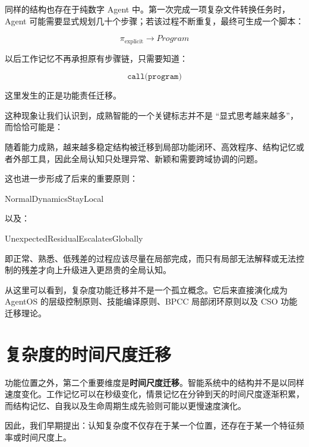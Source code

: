 同样的结构也存在于纯数字 Agent 中。第一次完成一项复杂文件转换任务时，Agent 可能需要显式规划几十个步骤；若该过程不断重复，最终可生成一个脚本：

\[
\pi_{\mathrm{explicit}}
\rightarrow
Program
\]

以后工作记忆不再承担原有步骤链，只需要知道：

\[
\texttt{call(program)}
\]

这里发生的正是功能责任迁移。

这种现象让我们认识到，成熟智能的一个关键标志并不是 ``显式思考越来越多''，而恰恰可能是：

\begin{statementbox}
\centering
{}
\end{statementbox}

随着能力成熟，越来越多稳定结构被迁移到局部功能闭环、高效程序、结构记忆或者外部工具，因此全局认知只处理异常、新颖和需要跨域协调的问题。

这也进一步形成了后来的重要原则：

\begin{statementbox}
NormalDynamicsStayLocal
\end{statementbox}

以及：

\begin{statementbox}
UnexpectedResidualEscalatesGlobally
\end{statementbox}

即正常、熟悉、低残差的过程应该尽量在局部完成，而只有局部无法解释或无法控制的残差才向上升级进入更昂贵的全局认知。

从这里可以看到，复杂度功能迁移并不是一个孤立概念。它后来直接演化成为 AgentOS 的层级控制原则、技能编译原则、BPCC 局部闭环原则以及 CSO 功能迁移理论。

\section{复杂度的时间尺度迁移}
\label{sec:timescale-complexity-migration}

功能位置之外，第二个重要维度是\textbf{时间尺度迁移}。智能系统中的结构并不是以同样速度变化。工作记忆可以在秒级变化，情景记忆在分钟到天的时间尺度逐渐积累，而结构记忆、自我以及生命周期生成先验则可能以更慢速度演化。

因此，我们早期提出：认知复杂度不仅存在于某一个位置，还存在于某一个特征频率或时间尺度上。

